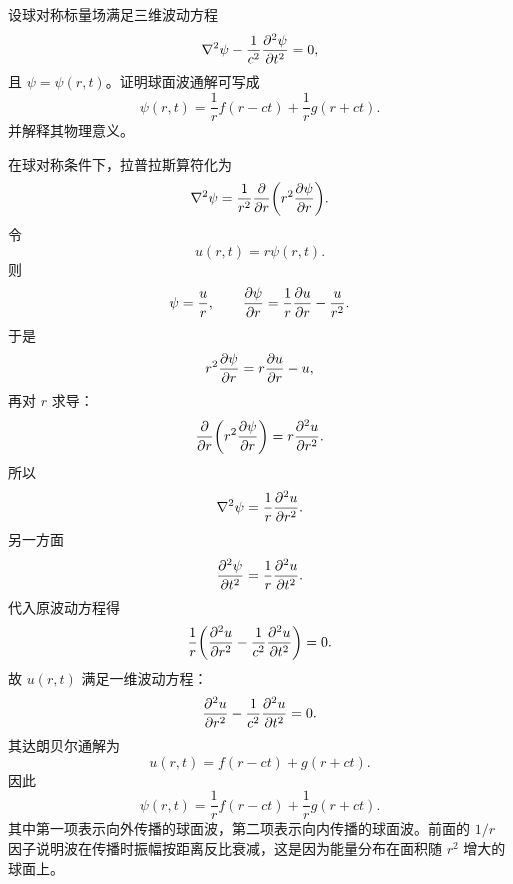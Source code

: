 \begin{problem}
设球对称标量场满足三维波动方程
\[
\nabla^2\psi-\frac{1}{c^2}\pdv[2]{\psi}{t}=0,
\]
且 $\psi=\psi(r,t)$。证明球面波通解可写成
\[
\psi(r,t)=\frac{1}{r}f(r-ct)+\frac{1}{r}g(r+ct).
\]
并解释其物理意义。
\begin{solution}
在球对称条件下，拉普拉斯算符化为
\[
\nabla^2\psi=\frac{1}{r^2}\pdv{}{r}\qty(r^2\pdv{\psi}{r}).
\]
令
\[
u(r,t)=r\psi(r,t).
\]
则
\[
\psi=\frac{u}{r},
\qquad
\pdv{\psi}{r}=\frac{1}{r}\pdv{u}{r}-\frac{u}{r^2}.
\]
于是
\[
r^2\pdv{\psi}{r}=r\pdv{u}{r}-u,
\]
再对 $r$ 求导：
\[
\pdv{}{r}\qty(r^2\pdv{\psi}{r})=r\pdv[2]{u}{r}.
\]
所以
\[
\nabla^2\psi=\frac{1}{r}\pdv[2]{u}{r}.
\]
另一方面
\[
\pdv[2]{\psi}{t}=\frac{1}{r}\pdv[2]{u}{t}.
\]
代入原波动方程得
\[
\frac{1}{r}\qty(\pdv[2]{u}{r}-\frac{1}{c^2}\pdv[2]{u}{t})=0.
\]
故 $u(r,t)$ 满足一维波动方程：
\[
\pdv[2]{u}{r}-\frac{1}{c^2}\pdv[2]{u}{t}=0.
\]
其达朗贝尔通解为
\[
u(r,t)=f(r-ct)+g(r+ct).
\]
因此
\[
\psi(r,t)=\frac{1}{r}f(r-ct)+\frac{1}{r}g(r+ct).
\]
其中第一项表示向外传播的球面波，第二项表示向内传播的球面波。前面的 $1/r$ 因子说明波在传播时振幅按距离反比衰减，这是因为能量分布在面积随 $r^2$ 增大的球面上。
\end{solution}
\end{problem}
